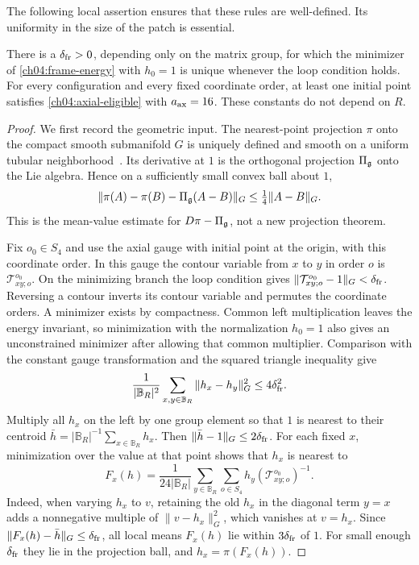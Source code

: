 The following local assertion ensures that these rules are well-defined.
Its uniformity in the size of the patch is essential.

\begin{lemma}
\label{ch04:frame-lemma}
There is a $\delta_{\rm fr}>0$, depending only on the matrix group, for
which the minimizer of \eqref{ch04:frame-energy} with $h_0=1$ is unique
whenever the loop condition holds. For every configuration and every fixed
coordinate order, at least one initial point satisfies \eqref{ch04:axial-eligible}
with $a_{\rm ax}=16$. These constants do not depend on $R$.
\end{lemma}
\begin{proof}
We first record the geometric input. The nearest-point projection $\pi$
onto the compact smooth submanifold $G$ is uniquely defined and smooth
on a uniform tubular neighborhood~\cite[p.~153, Lemma]{Foote1984}.
Its derivative at $1$ is the orthogonal projection $\Pi_{\mathfrak g}$ onto the
Lie algebra. Hence on a sufficiently small convex ball about $1$,
\begin{equation}
 \|\pi(A)-\pi(B)-\Pi_{\mathfrak g}(A-B)\|_G
       \le\tfrac14\|A-B\|_G.
 \label{ch04:projection-bound}
\end{equation}
This is the mean-value estimate for $D\pi-\Pi_{\mathfrak g}$, not a new
projection theorem.

Fix $o_0\in S_4$ and use the axial gauge with initial point at the origin, with this
coordinate order. In this gauge the contour variable from $x$ to $y$ in order
$o$ is $\mathcal T_{xy;o}^{o_0}$. On the minimizing branch the loop condition
gives $\|\mathcal T_{xy;o}^{o_0}-1\|_G<\delta_{\rm fr}$.
Reversing a contour inverts its contour variable and permutes the coordinate orders.
A minimizer exists by compactness. Common left multiplication leaves the
energy invariant, so minimization with the normalization $h_0=1$ also gives
an unconstrained minimizer after allowing that common multiplier.
Comparison with the constant gauge transformation and the squared triangle inequality give
\[
 \frac{1}{|\mathbb B_R|^2}\sum_{x,y\in\mathbb B_R}\|h_x-h_y\|_G^2\le4\delta_{\rm fr}^2.
\]
Multiply all $h_x$ on the left by one group element
so that $1$ is nearest to their centroid $\bar h=|\mathbb B_R|^{-1}\sum_{x\in\mathbb B_R} h_x$.
Then $\|\bar h-1\|_G\le2\delta_{\rm fr}$. For each fixed $x$, minimization over the value at that point shows
that $h_x$ is nearest to
\[
 F_x(h)=\frac{1}{24|\mathbb B_R|}\sum_{y\in\mathbb B_R}\sum_{o\in S_4}h_y(\mathcal T_{xy;o}^{o_0})^{-1}.
\]
Indeed, when varying $h_x$ to $v$, retaining the old $h_x$ in the
diagonal term $y=x$ adds a nonnegative multiple of $\|v-h_x\|_G^2$,
which vanishes at $v=h_x$.
Since $\|F_x(h)-\bar h\|_G\le\delta_{\rm fr}$, all local means $F_x(h)$ lie
within $3\delta_{\rm fr}$ of $1$. For small enough $\delta_{\rm fr}$ they lie in the projection ball,
and $h_x=\pi(F_x(h))$.


\end{proof}
